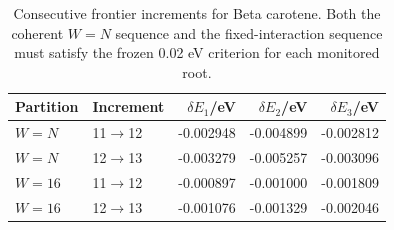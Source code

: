 \begin{table}[!htbp]\centering\small
\caption{Consecutive frontier increments for Beta carotene. Both the coherent $W=N$ sequence and the fixed-interaction sequence must satisfy the frozen 0.02 eV criterion for each monitored root.}
\begin{tabular}{llrrr}\toprule
Partition & Increment & $\delta E_1$/eV & $\delta E_2$/eV & $\delta E_3$/eV\\\midrule
$W=N$ & 11$\to$12 & -0.002948 & -0.004899 & -0.002812\\
$W=N$ & 12$\to$13 & -0.003279 & -0.005257 & -0.003096\\
$W=16$ & 11$\to$12 & -0.000897 & -0.001000 & -0.001809\\
$W=16$ & 12$\to$13 & -0.001076 & -0.001329 & -0.002046\\
\bottomrule\end{tabular}
\end{table}
